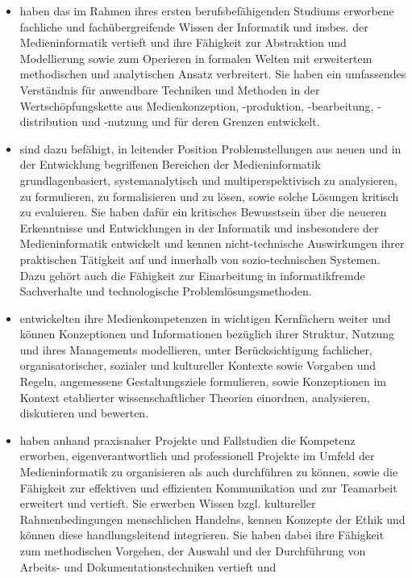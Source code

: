 \begin{itemize}
\tightlist
\item
  haben das im Rahmen ihres ersten berufsbefähigenden Studiums erworbene
  fachliche und fachübergreifende Wissen der Informatik und insbes. der
  Medieninformatik vertieft und ihre Fähigkeit zur Abstraktion und
  Modellierung sowie zum Operieren in formalen Welten mit erweitertem
  methodischen und analytischen Ansatz verbreitert. Sie haben ein
  umfassendes Verständnis für anwendbare Techniken und Methoden in der
  Wertschöpfungskette aus Medienkonzeption, -produktion, -bearbeitung,
  -distribution und -nutzung und für deren Grenzen entwickelt.
\item
  sind dazu befähigt, in leitender Position Problemstellungen aus neuen
  und in der Entwicklung begriffenen Bereichen der Medieninformatik
  grundlagenbasiert, systemanalytisch und multiperspektivisch zu
  analysieren, zu formulieren, zu formalisieren und zu lösen, sowie
  solche Lösungen kritisch zu evaluieren. Sie haben dafür ein kritisches
  Bewusstsein über die neueren Erkenntnisse und Entwicklungen in der
  Informatik und insbesondere der Medieninformatik entwickelt und kennen
  nicht-technische Auswirkungen ihrer praktischen Tätigkeit auf und
  innerhalb von sozio-technischen Systemen. Dazu gehört auch die
  Fähigkeit zur Einarbeitung in informatikfremde Sachverhalte und
  technologische Problemlösungsmethoden.
\item
  entwickelten ihre Medienkompetenzen in wichtigen Kernfächern weiter
  und können Konzeptionen und Informationen bezüglich ihrer Struktur,
  Nutzung und ihres Managements modellieren, unter Berücksichtigung
  fachlicher, organisatorischer, sozialer und kultureller Kontexte sowie
  Vorgaben und Regeln, angemessene Gestaltungsziele formulieren, sowie
  Konzeptionen im Kontext etablierter wissenschaftlicher Theorien
  einordnen, analysieren, diskutieren und bewerten.
\item
  haben anhand praxisnaher Projekte und Fallstudien die Kompetenz
  erworben, eigenverantwortlich und professionell Projekte im Umfeld der
  Medieninformatik zu organisieren als auch durchführen zu können, sowie
  die Fähigkeit zur effektiven und effizienten Kommunikation und zur
  Teamarbeit erweitert und vertieft. Sie erwerben Wissen bzgl.
  kultureller Rahmenbedingungen menschlichen Handelns, kennen Konzepte
  der Ethik und können diese handlungsleitend integrieren. Sie haben
  dabei ihre Fähigkeit zum methodischen Vorgehen, der Auswahl und der
  Durchführung von Arbeits- und Dokumentationstechniken vertieft und

\end{itemize}
